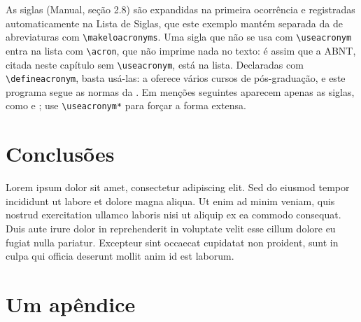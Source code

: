 \documentclass[dsc,setavermelha,numeracaoporcapitulo,linhanafolhaderosto]{ufrj}
\theoremstyle{plain}
\theoremstyle{definition}
\theoremstyle{remark}
\begin{document}
  As siglas (Manual, seção 2.8) são expandidas na primeira ocorrência e registradas automaticamente na Lista de Siglas, que este exemplo mantém separada da de abreviaturas com \verb|\makeloacronyms|. Uma sigla que não se usa com \verb|\useacronym| entra na lista com \verb|\acron|, que não imprime nada no texto: é assim que a ABNT, citada neste capítulo sem \verb|\useacronym|, está na lista. Declaradas com \verb|\defineacronym|, basta usá-las: a  oferece vários cursos de pós-graduação, e este programa segue as normas da . Em menções seguintes aparecem apenas as siglas, como  e ; use \verb|\useacronym*| para forçar a forma extensa.

  \chapter{Conclusões}

  Lorem ipsum dolor sit amet, consectetur adipiscing elit. Sed do eiusmod tempor incididunt ut labore et dolore magna aliqua. Ut enim ad minim veniam, quis nostrud exercitation ullamco laboris nisi ut aliquip ex ea commodo consequat. Duis aute irure dolor in reprehenderit in voluptate velit esse cillum dolore eu fugiat nulla pariatur. Excepteur sint occaecat cupidatat non proident, sunt in culpa qui officia deserunt mollit anim id est laborum.

  \backmatter

  \nocite{patente-example,legislacao-example,m-norma,mapa-example,partitura-example}
  \nocite{jurisprudencia-example}
  \nocite{videogame-example,filme-example,semautor-example,semautorart-example}
  \nocite{m-4236,jornal-example}
  \printbibliography

  \printglossarylist

\appendix

\chapter{Um apêndice}
\end{document}

